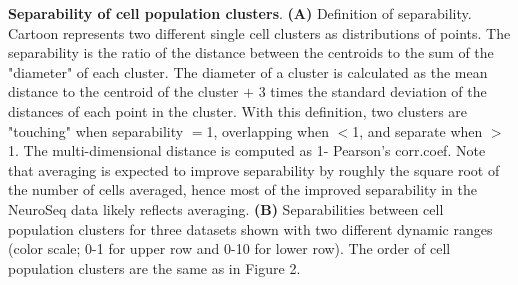 \textbf{Separability of cell population clusters}.
\textbf{(A)} Definition of separability. Cartoon represents two different single cell clusters as distributions of points. The separability is the ratio of the distance between the centroids to the sum of the "diameter" of each cluster. The diameter of a cluster is calculated as the mean distance to the centroid of the cluster $+$ 3 times the  standard deviation of the distances of each point in the cluster. With this definition, two clusters are "touching" when separability $=$1, overlapping when $<$1, and separate when $>$1. The multi-dimensional distance is computed as 1- Pearson's corr.coef. Note that averaging is expected to improve separability by roughly the square root of the number of cells averaged, hence most of the improved separability in the NeuroSeq data likely reflects averaging. 
\textbf{(B)} Separabilities between cell population clusters for three datasets shown with two different dynamic ranges (color scale; 0-1 for upper row and 0-10 for lower row).  The order of cell population clusters are the same as in Figure 2.